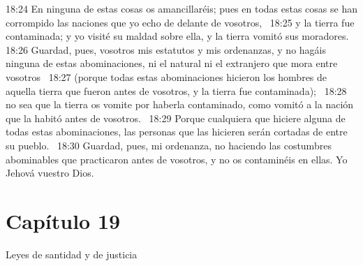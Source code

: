 18:24 En ninguna de estas cosas os amancillaréis; pues en todas estas cosas se han corrompido las naciones que yo echo de delante de vosotros,  
18:25 y la tierra fue contaminada; y yo visité su maldad sobre ella, y la tierra vomitó sus moradores.  
18:26 Guardad, pues, vosotros mis estatutos y mis ordenanzas, y no hagáis ninguna de estas abominaciones, ni el natural ni el extranjero que mora entre vosotros  
18:27 (porque todas estas abominaciones hicieron los hombres de aquella tierra que fueron antes de vosotros, y la tierra fue contaminada);  
18:28 no sea que la tierra os vomite por haberla contaminado, como vomitó a la nación que la habitó antes de vosotros.  
18:29 Porque cualquiera que hiciere alguna de todas estas abominaciones, las personas que las hicieren serán cortadas de entre su pueblo.  
18:30 Guardad, pues, mi ordenanza, no haciendo las costumbres abominables que practicaron antes de vosotros, y no os contaminéis en ellas. Yo Jehová vuestro Dios.  
\section*{Capítulo 19}
Leyes de santidad y de justicia  


